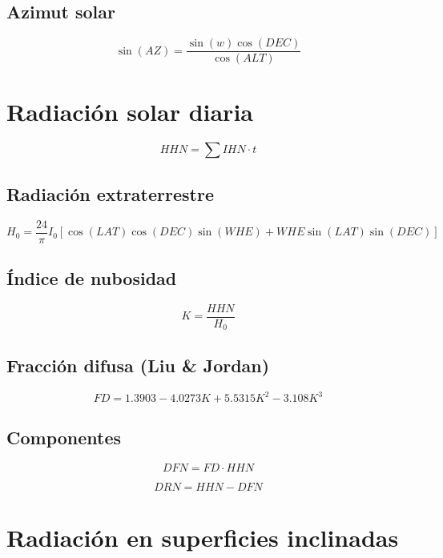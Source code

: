 \documentclass[12pt]{article}
\begin{document}
\subsection*{Azimut solar}
\begin{equation}
\sin(AZ) = \frac{\sin(w)\cos(DEC)}{\cos(ALT)}
\end{equation}

\section*{Radiación solar diaria}

\begin{equation}
HHN = \sum IHN \cdot t
\end{equation}

\subsection*{Radiación extraterrestre}
\begin{equation}
H_0 = \frac{24}{\pi} I_0 \left[ \cos(LAT)\cos(DEC)\sin(WHE) + WHE\sin(LAT)\sin(DEC) \right]
\end{equation}

\subsection*{Índice de nubosidad}
\begin{equation}
K = \frac{HHN}{H_0}
\end{equation}

\subsection*{Fracción difusa (Liu \& Jordan)}
\begin{equation}
FD = 1.3903 - 4.0273K + 5.5315K^2 - 3.108K^3
\end{equation}

\subsection*{Componentes}
\begin{equation}
DFN = FD \cdot HHN
\end{equation}

\begin{equation}
DRN = HHN - DFN
\end{equation}

\section*{Radiación en superficies inclinadas}
\end{document}

